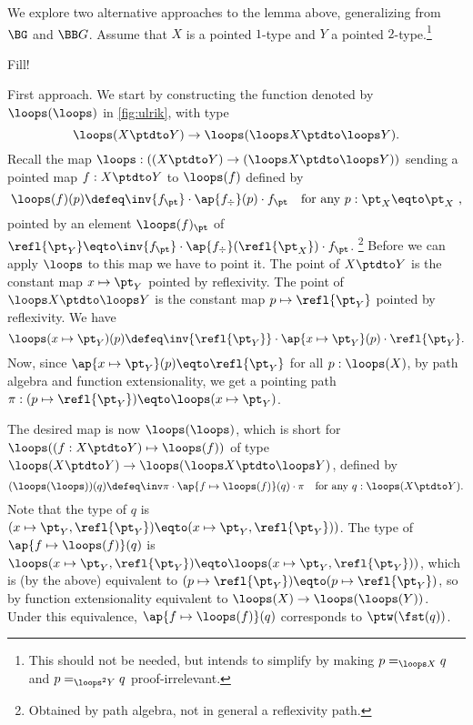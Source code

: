 \begin{remark}\label{rem:grpHomOK}
We explore two alternative approaches to the lemma above,
generalizing from $\BG$ and $\BB G$.
Assume that $X$ is a pointed $1$-type and $Y$ a
pointed $2$-type.\footnote{This should not be needed, but intends to
simplify by making $p=_{\loops X}q$ and $p=_{{\loops}^2 Y}q$
proof-irrelevant.}
\begin{marginfigure}
  \caption{\label{fig:ulrik}
  Fill!} 
\end{marginfigure}

First approach. We start by constructing the function 
denoted by ${\loops(\loops)}$ in \cref{fig:ulrik}, with type 
$$\loops(X\ptdto Y) \to \loops(\loops X\ptdto \loops Y).$$
Recall the map $\loops : ((X\ptdto Y)\to(\loops X\ptdto \loops Y))$
sending  a pointed map $f:X\ptdto Y$ to $\loops(f)$ defined by 
\[
\loops(f)(p) \defeq \inv{f_\pt}\cdot \ap{f_\div}(p) \cdot f_\pt
\quad\text{for any $p:\pt_X\eqto\pt_X $,}
\]
pointed by an element $\loops(f)_\pt$ of 
$\refl{\pt_Y} \eqto \inv{f_\pt}\cdot \ap{f_\div}(\refl{\pt_X}) \cdot f_\pt$.%
\footnote{
Obtained by path algebra, not in general a reflexivity path.}
Before we can apply ${\loops}$ to this map we have to point it.
The point of $X\ptdto Y$ is the constant 
map $x\mapsto\pt_Y$ pointed by reflexivity.
The point of $\loops X\ptdto \loops Y$ is the constant 
map $p\mapsto\refl{\pt_Y}$ pointed by reflexivity.
We have
\[
\loops(x\mapsto\pt_Y)(p) \defeq 
\inv{\refl{\pt_Y}}\cdot \ap{x\mapsto\pt_Y}(p) \cdot \refl{\pt_Y}.
\]
Now, since $\ap{x\mapsto\pt_Y}(p) \eqto \refl{\pt_Y}$ 
for all $p: \loops(X)$, by path algebra and function extensionality, 
we get a pointing path
$\pi: (p\mapsto \refl{\pt_Y})\eqto \loops(x\mapsto\pt_Y)$.

The desired map is now $\loops(\loops)$, which is short for
$\loops((f:X\ptdto Y) \mapsto \loops(f))$ of type $\loops(X\ptdto Y) \to \loops(\loops X\ptdto \loops Y)$, defined by
\[
(\loops(\loops))(q)\defeq\inv\pi\cdot\ap{f\mapsto\loops(f)}(q)\cdot\pi
\quad\text{for any $q:\loops(X\ptdto Y)$}.
\]
Note that the type of $q$ is 
$(x\mapsto\pt_Y,\refl{\pt_Y})\eqto(x\mapsto\pt_Y,\refl{\pt_Y}))$.
The type of $\ap{f\mapsto\loops(f)}(q)$ is
$\loops(x\mapsto\pt_Y,\refl{\pt_Y})\eqto\loops(x\mapsto\pt_Y,\refl{\pt_Y}))$,
which is (by the above) equivalent to 
$(p\mapsto \refl{\pt_Y})\eqto(p\mapsto \refl{\pt_Y})$,
so by function extensionality equivalent to 
$\loops(X)\to\loops(\loops(Y))$. Under this equivalence,
$\ap{f\mapsto\loops(f)}(q)$ corresponds to $\ptw(\fst(q))$. 


\end{remark}
